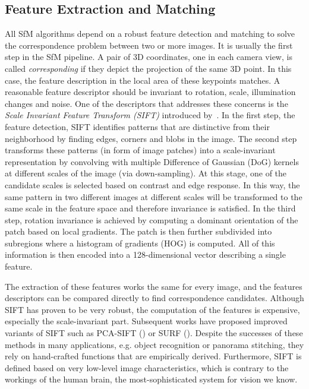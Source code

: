 		\subsection{Feature Extraction and Matching}
			All SfM algorithms depend on a robust feature detection and matching to solve the correspondence problem between two or more images.
			It is usually the first step in the SfM pipeline.
			A pair of 3D coordinates, one in each camera view, is called \emph{corresponding} if they depict the projection of the same 3D point.
			In this case, the feature description in the local area of these keypoints matches.
			A reasonable feature descriptor should be invariant to rotation, scale, illumination changes and noise.
			One of the descriptors that addresses these concerns is the \emph{Scale Invariant Feature Transform (SIFT)} introduced by~\cite{lowe1999object}.
			In the first step, the feature detection, SIFT identifies patterns that are distinctive from their neighborhood by finding edges, corners and blobs in the image.
			The second step transforms these patterns (in form of image patches) into a scale-invariant representation by convolving with multiple Difference of Gaussian (DoG) kernels at different scales of the image (via down-sampling).
			At this stage, one of the candidate scales is selected based on contrast and edge response.
			In this way, the same pattern in two different images at different scales will be transformed to the same scale in the feature space and therefore invariance is satisfied.
			In the third step, rotation invariance is achieved by computing a dominant orientation of the patch based on local gradients.
			The patch is then further subdivided into subregions where a histogram of gradients (HOG) is computed.
			All of this information is then encoded into a 128-dimensional vector describing a single feature.
			
			The extraction of these features works the same for every image, and the features descriptors can be compared directly to find correspondence candidates.
			Although SIFT has proven to be very robust, the computation of the features is expensive, especially the scale-invariant part.
			Subsequent works have proposed improved variants of SIFT such as PCA-SIFT (\cite{ke2004pca}) or SURF (\cite{bay2006surf}).
			Despite the successes of these methods in many applications, e.g. object recognition or panorama stitching, they rely on hand-crafted functions that are empirically derived.
			Furthermore, SIFT is defined based on very low-level image characteristics, which is contrary to the workings of the human brain, the most-sophisticated system for vision we know.
			

